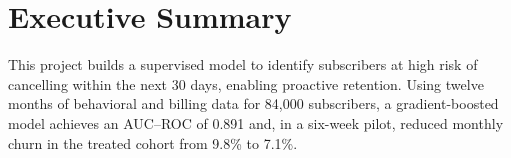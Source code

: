 \section{Executive Summary}
This project builds a supervised model to identify subscribers at high risk of cancelling
within the next 30 days, enabling proactive retention. Using twelve months of behavioral and
billing data for 84,000 subscribers, a gradient-boosted model achieves an AUC--ROC of 0.891
and, in a six-week pilot, reduced monthly churn in the treated cohort from 9.8\% to 7.1\%.
